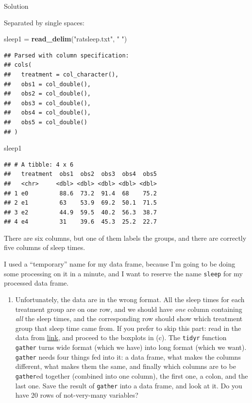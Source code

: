 \documentclass[]{tufte-book}
\newenvironment{Shaded}{}{}
\newcommand{\KeywordTok}[1]{\textcolor[rgb]{0.00,0.44,0.13}{\textbf{#1}}}
\newcommand{\NormalTok}[1]{#1}
\newcommand{\StringTok}[1]{\textcolor[rgb]{0.25,0.44,0.63}{#1}}
\providecommand{\tightlist}{%
  \setlength{\itemsep}{0pt}\setlength{\parskip}{0pt}}
\theoremstyle{definition}
\theoremstyle{definition}
\theoremstyle{definition}
\theoremstyle{remark}
\begin{document}
Solution

Separated by single spaces:

\begin{Shaded}
\begin{Highlighting}[]
\NormalTok{sleep1 =}\StringTok{ }\KeywordTok{read_delim}\NormalTok{(}\StringTok{"ratsleep.txt"}\NormalTok{, }\StringTok{" "}\NormalTok{)}
\end{Highlighting}
\end{Shaded}

\begin{verbatim}
## Parsed with column specification:
## cols(
##   treatment = col_character(),
##   obs1 = col_double(),
##   obs2 = col_double(),
##   obs3 = col_double(),
##   obs4 = col_double(),
##   obs5 = col_double()
## )
\end{verbatim}

\begin{Shaded}
\begin{Highlighting}[]
\NormalTok{sleep1}
\end{Highlighting}
\end{Shaded}

\begin{verbatim}
## # A tibble: 4 x 6
##   treatment  obs1  obs2  obs3  obs4  obs5
##   <chr>     <dbl> <dbl> <dbl> <dbl> <dbl>
## 1 e0         88.6  73.2  91.4  68    75.2
## 2 e1         63    53.9  69.2  50.1  71.5
## 3 e2         44.9  59.5  40.2  56.3  38.7
## 4 e4         31    39.6  45.3  25.2  22.7
\end{verbatim}

There are six columns, but one of them labels the groups, and there are
correctly five columns of sleep times.

I used a ``temporary'' name for my data frame, because I'm going to be
doing some processing on it in a minute, and I want to reserve the name
\texttt{sleep} for my processed data frame.

\begin{enumerate}
\def\labelenumi{(\alph{enumi})}
\setcounter{enumi}{1}
\tightlist
\item
  Unfortunately, the data are in the wrong format. All the sleep times
  for each treatment group are on one row, and we should have \emph{one}
  column containing \emph{all} the sleep times, and the corresponding
  row should show which treatment group that sleep time came from. If
  you prefer to skip this part: read in the data from
  \href{http://www.utsc.utoronto.ca/~butler/c32/ratsleep2.txt}{link},
  and proceed to the boxplots in (c). The \texttt{tidyr} function
  \texttt{gather} turns wide format (which we have) into long format
  (which we want). \texttt{gather} needs four things fed into it: a data
  frame, what makes the columns different, what makes them the same, and
  finally which columns are to be \texttt{gather}ed together (combined
  into one column), the first one, a colon, and the last one. Save the
  result of \texttt{gather} into a data frame, and look at it. Do you
  have 20 rows of not-very-many variables?
\end{enumerate}
\end{document}

